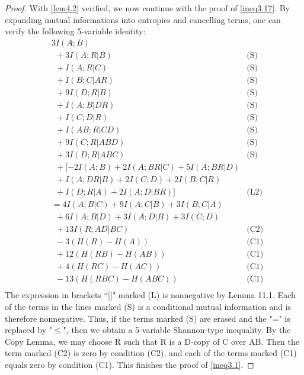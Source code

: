 \documentclass[10pt,journal]{IEEEtran}
\begin{document}
\begin{proof}
With \eqref{lem4.2} verified, we now continue with the proof of \eqref{ineq3.17}.
By expanding mutual informations into entropies and cancelling
terms, one can verify the following 5-variable identity:
\begin{align*}
&3I(A;B)&\\
      &\ \ + 3I(A;R|B)                                                         & \text{(S)} \\
      &\ \ + I(A;R|C)                                                          & \text{(S)} \\
      &\ \ + I(B;C|AR)                                                         & \text{(S)} \\
      &\ \ + 9I(D;R|B)                                                        & \text{(S)} \\
      &\ \ + I(A;B|DR)                                                       & \text{(S)} \\
      &\ \ + I(C;D|R)                                                        & \text{(S)} \\
      &\ \ + I(AB;R|CD)                                                        & \text{(S)} \\
      &\ \ + 9I(C;R|ABD)                                                        & \text{(S)} \\
      &\ \ + 3I(D;R|ABC)                                                        & \text{(S)} \\
      &\ \ + [-2I(A;B)+2I(A;BR|C)+5I(A;BR|D)\\
      &\ \ +I(A;DR|B)+2I(C;D)+2I(B;C|R)\\
      &\ \ +I(D;R|A)+2I(A;D|BR)]                                                & \text{(L2)} \\
      & = 4I(A;B|C)+9I(A;C|B)+3I(B;C|A)\\
      &\ \ +6I(A;B|D)+3I(A;D|B)+3I(C;D)\\
      &\ \ + 13I(R;AD|BC)                                                       & \text{(C2)} \\
      &\ \ - 3(H(R)-H(A))                                                       & \text{(C1)} \\
      &\ \ + 12(H(RB)-H(AB))                                                   & \text{(C1)} \\
      &\ \ + 4(H(RC)-H(AC))                                                    & \text{(C1)} \\
      &\ \ - 13(H(RBC)-H(ABC))                                                 & \text{(C1)} \\
\end{align*}
The expression in brackets ``[]" marked (L) is nonnegative by Lemma 11.1.
Each of the terms in the lines marked (S) is a conditional mutual
information and is therefore nonnegative.  Thus, if the terms marked (S)
are erased and the "=" is replaced by "$\le$", then we obtain a 5-variable
Shannon-type inequality.  By the Copy Lemma, we may choose R such
that R is a D-copy of C over AB.  Then the term marked (C2) is zero
by condition (C2), and each of the terms marked (C1) equals zero
by condition (C1).    This finishes the proof of \eqref{ineq3.1}.


\end{proof}
\end{document}
